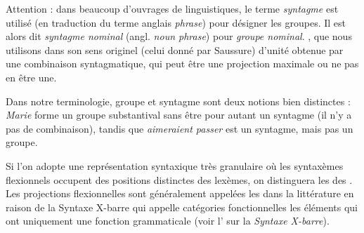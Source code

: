 \begin{tblsframed}{}
\noindent Attention : dans beaucoup d’ouvrages de linguistiques, le terme \textit{syntagme} est utilisé (en traduction du terme anglais \textit{phrase}) pour désigner les groupes. Il est alors dit \textit{syntagme nominal} (angl. \textit{noun phrase}) pour \textit{groupe nominal}. , que nous utilisons dans son sens originel (celui donné par Saussure) d’unité obtenue par une combinaison syntagmatique, qui peut être une projection maximale ou ne pas en être une.

Dans notre terminologie, groupe et syntagme sont deux notions bien distinctes : \textit{Marie} forme un groupe substantival sans être pour autant un syntagme (il n’y a pas de combinaison), tandis que \textit{aimeraient passer} est un syntagme, mais pas un groupe.
\end{tblsframed}



Si l’on adopte une représentation syntaxique très granulaire où les syntaxèmes flexionnels occupent des positions distinctes des lexèmes, on distinguera les  des . Les projections flexionnelles sont généralement appelées les  dans la littérature en raison de la Syntaxe X-barre qui appelle catégories fonctionnelles les éléments qui ont uniquement une fonction grammaticale (voir l’ sur la \textit{Syntaxe X-barre}).



